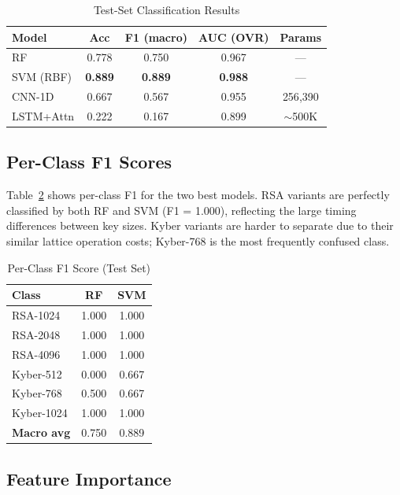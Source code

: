 \documentclass[conference]{IEEEtran}
\begin{document}
\begin{table}[h]
\caption{Test-Set Classification Results}
\label{tab:results}
\centering
\begin{tabular}{lcccc}
\toprule
\textbf{Model} & \textbf{Acc} & \textbf{F1 (macro)} & \textbf{AUC (OVR)} & \textbf{Params} \\
\midrule
RF             & 0.778 & 0.750 & 0.967 & --- \\
SVM (RBF)      & \textbf{0.889} & \textbf{0.889} & \textbf{0.988} & --- \\
CNN-1D         & 0.667 & 0.567 & 0.955 & 256{,}390 \\
LSTM+Attn      & 0.222 & 0.167 & 0.899 & $\sim$500K \\
\bottomrule
\end{tabular}
\end{table}

\subsection{Per-Class F1 Scores}

Table~\ref{tab:perclass} shows per-class F1 for the two best models.
RSA variants are perfectly classified by both RF and SVM (F1 = 1.000),
reflecting the large timing differences between key sizes.
Kyber variants are harder to separate due to their similar lattice
operation costs; Kyber-768 is the most frequently confused class.

\begin{table}[h]
\caption{Per-Class F1 Score (Test Set)}
\label{tab:perclass}
\centering
\begin{tabular}{lcc}
\toprule
\textbf{Class} & \textbf{RF} & \textbf{SVM} \\
\midrule
RSA-1024   & 1.000 & 1.000 \\
RSA-2048   & 1.000 & 1.000 \\
RSA-4096   & 1.000 & 1.000 \\
Kyber-512  & 0.000 & 0.667 \\
Kyber-768  & 0.500 & 0.667 \\
Kyber-1024 & 1.000 & 1.000 \\
\midrule
\textbf{Macro avg} & 0.750 & 0.889 \\
\bottomrule
\end{tabular}
\end{table}

\subsection{Feature Importance}
\end{document}
